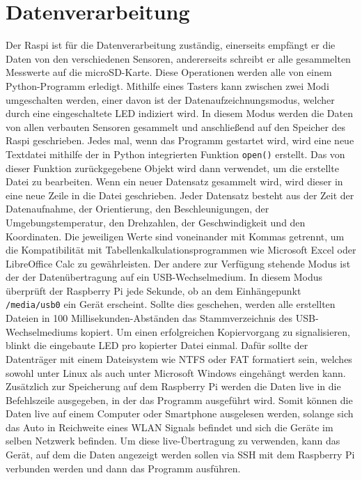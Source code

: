 \section{Datenverarbeitung}
\label{sec:Datenverarbeitung}
Der \ac{Raspi} ist für die Datenverarbeitung zuständig, einerseits empfängt er die Daten von den verschiedenen Sensoren, andererseits schreibt er alle gesammelten Messwerte auf die microSD-Karte. Diese Operationen werden alle von einem Python-Programm erledigt. Mithilfe eines Tasters kann zwischen zwei Modi umgeschalten werden, einer davon ist der Datenaufzeichnungsmodus, welcher durch eine eingeschaltete \ac{LED} indiziert wird. In diesem Modus werden die Daten von allen verbauten Sensoren gesammelt und anschließend auf den Speicher des \ac{Raspi} geschrieben. Jedes mal, wenn das Programm gestartet wird, wird eine neue Textdatei mithilfe der in Python integrierten Funktion \verb|open()| erstellt. Das von dieser Funktion zurückgegebene Objekt wird dann verwendet, um die erstellte Datei zu bearbeiten. Wenn ein neuer Datensatz gesammelt wird, wird dieser in eine neue Zeile in die Datei geschrieben. Jeder Datensatz besteht aus der Zeit der Datenaufnahme, der Orientierung, den Beschleunigungen, der Umgebungstemperatur, den Drehzahlen, der Geschwindigkeit und den Koordinaten. Die jeweiligen Werte sind voneinander mit Kommas getrennt, um die Kompatibilität mit Tabellenkalkulationsprogrammen wie Microsoft Excel oder LibreOffice Calc zu gewährleisten. Der andere zur Verfügung stehende Modus ist der der Datenübertragung auf ein \ac{USB}-Wechselmedium. In diesem Modus überprüft der Raspberry Pi jede Sekunde, ob an dem Einhängepunkt \verb|/media/usb0| ein Gerät erscheint. Sollte dies geschehen, werden alle erstellten Dateien in 100 Millisekunden-Abständen das Stammverzeichnis des \ac{USB}-Wechselmediums kopiert. Um einen erfolgreichen Kopiervorgang zu signalisieren, blinkt die eingebaute \ac{LED} pro kopierter Datei einmal. Dafür sollte der Datenträger mit einem Dateisystem wie \ac{NTFS} oder \ac{FAT} formatiert sein, welches sowohl unter Linux als auch unter Microsoft Windows eingehängt werden kann. 
\\
Zusätzlich zur Speicherung auf dem Raspberry Pi werden die Daten live in die Befehlszeile ausgegeben, in der das Programm ausgeführt wird. Somit können die Daten live auf einem Computer oder Smartphone ausgelesen werden, solange sich das Auto in Reichweite eines \ac{WLAN} Signals befindet und sich die Geräte im selben Netzwerk befinden. Um diese live-Übertragung zu verwenden, kann das Gerät, auf dem die Daten angezeigt werden sollen via \ac{SSH} mit dem Raspberry Pi verbunden werden und dann das Programm ausführen.